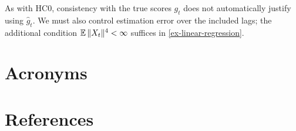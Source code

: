 \documentclass[a4paper,12pt]{article}
\begin{document}
\begin{remark}\label{rem-estimated-scores}
	As with HC0, consistency with the true scores $g_t$ does not automatically justify using $\widehat g_t$.
	We must also control estimation error over the included lags;
	the additional condition $\operatorname{\mathbb{E}}\|X_t\|^4<\infty$ suffices in \autoref{ex-linear-regression}.
\end{remark}

\vfill
\section*{Acronyms}
\printglossaries

\section*{References}
\printbibliography[heading=none]
\end{document}
